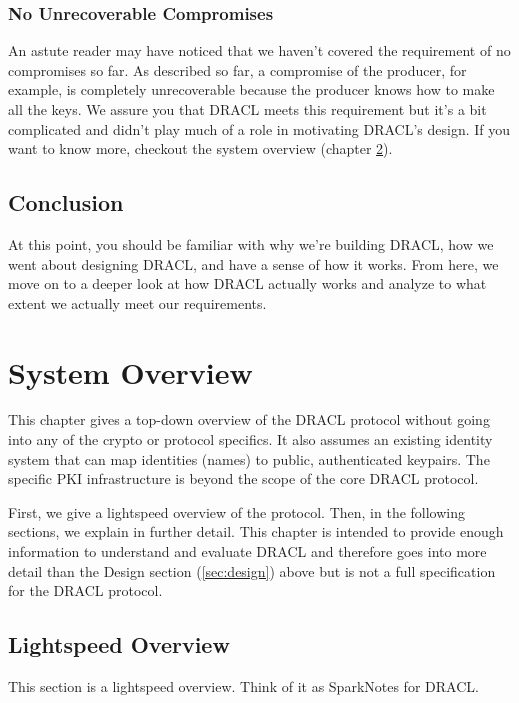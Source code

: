 \documentclass[pdftex,12pt,a4papaer,twoside,notitlepage]{report}
\begin{document}
\subsection{No Unrecoverable Compromises}

An astute reader may have noticed that we haven't covered the requirement of no
compromises so far. As described so far, a compromise of the producer, for
example, is completely unrecoverable because the producer knows how to make all
the keys. We assure you that DRACL meets this requirement but it's a bit
complicated and didn't play much of a role in motivating DRACL's design. If you
want to know more, checkout the system overview (chapter \ref{chap:system-overview}).

\section{Conclusion}

At this point, you should be familiar with why we're building DRACL, how we went
about designing DRACL, and have a sense of how it works. From here, we move on
to a deeper look at how DRACL actually works and analyze to what extent we
actually meet our requirements.

\chapter{System Overview}
\label{chap:system-overview}

This chapter gives a top-down overview of the DRACL protocol without going into
any of the crypto or protocol specifics. It also assumes an existing identity
system that can map identities (names) to public, authenticated keypairs. The
specific PKI infrastructure is beyond the scope of the core DRACL protocol.

First, we give a lightspeed overview of the protocol. Then, in the following
sections, we explain in further detail. This chapter is intended to provide
enough information to understand and evaluate DRACL and therefore goes into more
detail than the Design section (\ref{sec:design}) above but is not a full
specification for the DRACL protocol.

\section{Lightspeed Overview}

This section is a lightspeed overview. Think of it as SparkNotes\texttrademark{}
for DRACL.
\end{document}
